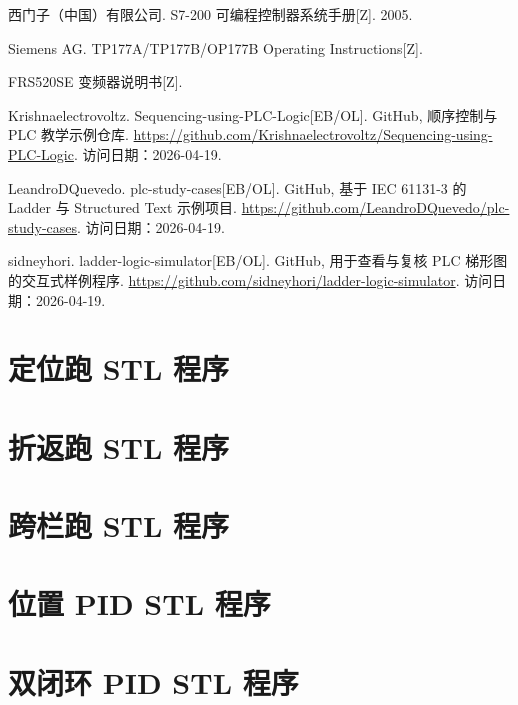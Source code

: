 \documentclass[12pt,a4paper]{ctexart}
\begin{document}
\begin{sloppypar}
\small
\begin{enumerate}[label={[\arabic*]}]
    \item 西门子（中国）有限公司. S7-200 可编程控制器系统手册[Z]. 2005.
    \item Siemens AG. TP177A/TP177B/OP177B Operating Instructions[Z].
    \item FRS520SE 变频器说明书[Z].
    \item Krishnaelectrovoltz. Sequencing-using-PLC-Logic[EB/OL]. GitHub, 顺序控制与 PLC 教学示例仓库. \url{https://github.com/Krishnaelectrovoltz/Sequencing-using-PLC-Logic}. 访问日期：2026-04-19.
    \item LeandroDQuevedo. plc-study-cases[EB/OL]. GitHub, 基于 IEC 61131-3 的 Ladder 与 Structured Text 示例项目. \url{https://github.com/LeandroDQuevedo/plc-study-cases}. 访问日期：2026-04-19.
    \item sidneyhori. ladder-logic-simulator[EB/OL]. GitHub, 用于查看与复核 PLC 梯形图的交互式样例程序. \url{https://github.com/sidneyhori/ladder-logic-simulator}. 访问日期：2026-04-19.
\end{enumerate}
\normalsize
\end{sloppypar}

\clearpage
\appendix
\section{定位跑 STL 程序}

\clearpage
\section{折返跑 STL 程序}

\clearpage
\section{跨栏跑 STL 程序}

\clearpage
\section{位置 PID STL 程序}

\clearpage
\section{双闭环 PID STL 程序}
\end{document}
